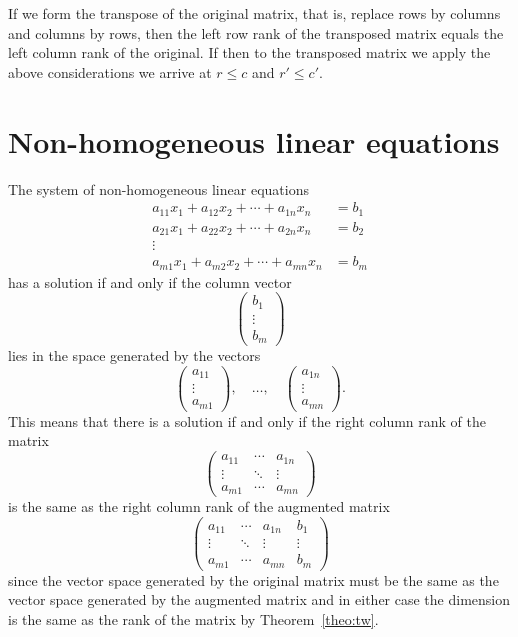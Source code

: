 \documentclass[10pt,leqno,a5paper]{book}
\theoremstyle{definition}
\let\htw\section
\begin{document}
If we form the transpose of the original matrix, that is, replace rows by columns and columns by rows, then the left row rank of the transposed matrix equals the left column rank of the original.
If then to the transposed matrix we apply the above considerations we arrive at $r \leq c$ and $r' \leq c'$.



\htw{Non-homogeneous linear equations}

The system of non-homogeneous linear equations
\begin{equation}
\label{eq:Etw}
\begin{aligned}
a_{11}x_1 + a_{12}x_2 + \cdots + a_{1n}x_n &= b_1
\\
a_{21}x_1 + a_{22}x_2 + \cdots + a_{2n}x_n &= b_2
\\
\vdots &
\\
a_{m1}x_1 + a_{m2}x_2 + \cdots + a_{mn}x_n &= b_m
\end{aligned}
\end{equation}
has a solution if and only if the column vector
\[
\begin{pmatrix}
b_1 \\ \vdots \\ b_m
\end{pmatrix}
\]
lies in the space generated by the vectors
\[
\begin{pmatrix}
a_{11} \\ \vdots \\ a_{m1}
\end{pmatrix}
,\quad \ldots,\quad
\begin{pmatrix}
a_{1n} \\ \vdots \\ a_{mn}
\end{pmatrix}.
\]
This means that there is a solution if and only if the right column rank of the matrix
\[
\begin{pmatrix}
a_{11} & \cdots & a_{1n}
\\
\vdots & \ddots & \vdots
\\
a_{m1} & \cdots & a_{mn}
\end{pmatrix}
\]
is the same as the right column rank of the augmented matrix
\[
\begin{pmatrix}
a_{11} & \cdots & a_{1n} & b_1
\\
\vdots & \ddots & \vdots & \vdots
\\
a_{m1} & \cdots & a_{mn} & b_m
\end{pmatrix}
\]
since the vector space generated by the original matrix must be the same as the vector space generated by the augmented matrix and in either case the dimension is the same as the rank of the matrix by Theorem~\ref{theo:tw}.
\end{document}
